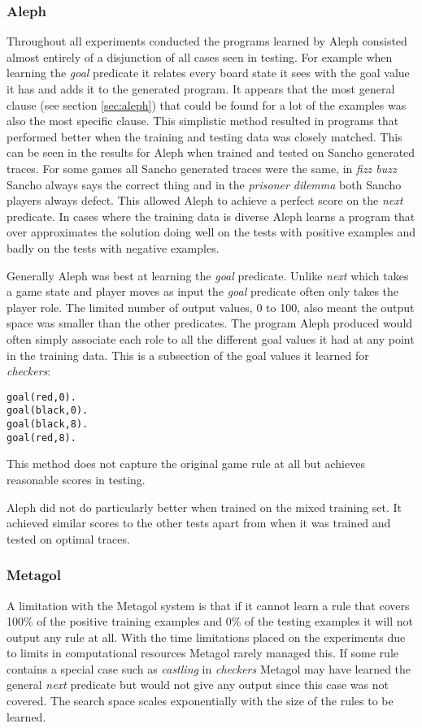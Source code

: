 \subsubsection{Aleph}
Throughout all experiments conducted the programs learned by Aleph consisted almost entirely of a disjunction of all cases seen in testing. For example when learning the \textit{goal} predicate it relates every board state it sees with the goal value it has and adds it to the generated program. It appears that the most general clause (see section \ref{sec:aleph}) that could be found for a lot of the examples was also the most specific clause. This simplistic method resulted in programs that performed better when the training and testing data was closely matched. This can be seen in the results for Aleph when trained and tested on Sancho generated traces. For some games all Sancho generated traces were the same, in \textit{fizz buzz} Sancho always says the correct thing and in the \textit{prisoner dilemma} both Sancho players always defect. This allowed Aleph to achieve a perfect score on the \textit{next} predicate. In cases where the training data is diverse Aleph learns a program that over approximates the solution doing well on the tests with positive examples and badly on the tests with negative examples.

Generally Aleph was best at learning the \textit{goal} predicate. Unlike \textit{next} which takes a game state and player moves as input the \textit{goal} predicate often only takes the player role. The limited number of output values, 0 to 100, also meant the output space was smaller than the other predicates. The program Aleph produced would often simply associate each role to all the different goal values it had at any point in the training data. This is a subsection of the goal values it learned for \textit{checkers}:
\begin{verbatim}
goal(red,0).
goal(black,0).
goal(black,8).
goal(red,8).
\end{verbatim}
This method does not capture the original game rule at all but achieves reasonable scores in testing.

Aleph did not do particularly better when trained on the mixed training set. It achieved similar scores to the other tests apart from when it was trained and tested on optimal traces.

\subsubsection{Metagol}
A limitation with the Metagol system is that if it cannot learn a rule that covers 100\% of the positive training examples and 0\% of the testing examples it will not output any rule at all. With the time limitations placed on the experiments due to limits in computational resources Metagol rarely managed this. If some rule contains a special case such as \textit{castling} in \textit{checkers} Metagol may have learned the general \textit{next} predicate but would not give any output since this case was not covered. The search space scales exponentially with the size of the rules to be learned.

